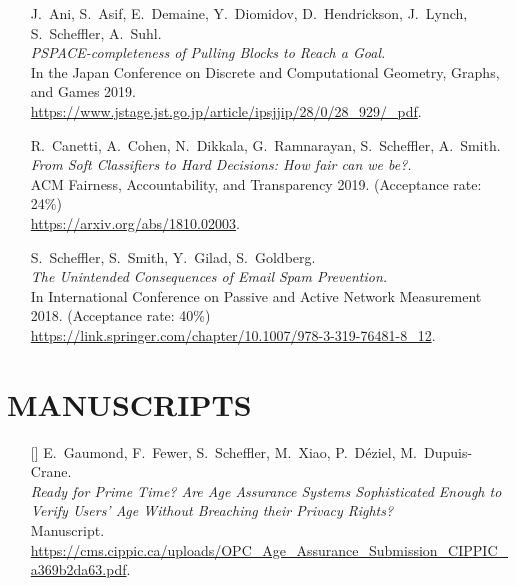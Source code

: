 \documentclass{res}
\begin{document}
\begin{resume}
\begin{itemize}
\item[\pullingblocks] J.~Ani, S.~Asif, E.~Demaine, Y.~Diomidov, D.~Hendrickson, J.~Lynch, S.~Scheffler, A.~Suhl. \\
\emph{PSPACE-completeness of Pulling Blocks to Reach a Goal.}  \\
In the Japan Conference on Discrete and Computational Geometry, Graphs, and Games 2019. \\
\url{https://www.jstage.jst.go.jp/article/ipsjjip/28/0/28_929/_pdf}.

\item[\fairsibility] R.~Canetti, A.~Cohen, N.~Dikkala, G.~Ramnarayan, S.~Scheffler, A.~Smith. \\
\emph{From Soft Classifiers to Hard Decisions: How fair can we be?.} \\
ACM Fairness, Accountability, and Transparency 2019. (Acceptance rate: 24\%) \\
\url{https://arxiv.org/abs/1810.02003}.

\item[\emailspam] S.~Scheffler, S.~Smith, Y.~Gilad, S.~Goldberg. \\
\emph{The Unintended Consequences of Email Spam Prevention.} \\
In International Conference on Passive and Active Network Measurement 2018. (Acceptance rate: 40\%) \\
\url{https://link.springer.com/chapter/10.1007/978-3-319-76481-8\_12}.
\end{itemize}

\section{MANUSCRIPTS}
\vspace{0.25in}

\edef\ageVerifPrimeTime{[\arabic{citctr}]}
\edef\scramDeviations{[\arabic{citctr}]}
\edef\autonomousWeapons{[\arabic{citctr}]}
\edef\bog{[\arabic{citctr}]}

\begin{itemize}
\item[\ageVerifPrimeTime] E.~Gaumond, F.~Fewer, S.~Scheffler, M.~Xiao, P.~D\'eziel, M.~Dupuis-Crane. \\
\emph{Ready for Prime Time? Are Age Assurance Systems Sophisticated Enough to Verify Users' Age Without Breaching their Privacy Rights?} \\
Manuscript.  \\
\url{https://cms.cippic.ca/uploads/OPC_Age_Assurance_Submission_CIPPIC_a369b2da63.pdf}.


\end{itemize}
\end{resume}
\end{document}

